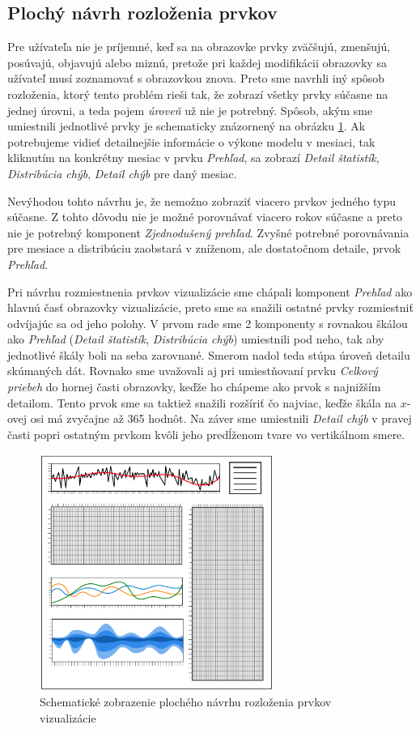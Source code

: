 \subsection{Plochý návrh rozloženia prvkov} %
Pre užívateľa nie je príjemné, keď sa na obrazovke prvky zväčšujú, zmenšujú, posúvajú, objavujú alebo miznú, pretože pri každej modifikácii obrazovky sa užívateľ musí zoznamovať s obrazovkou znova.
Preto sme navrhli iný spôsob rozloženia, ktorý tento problém rieši tak, že zobrazí všetky prvky súčasne na jednej úrovni, a teda pojem \textit{úroveň} už nie je potrebný. Spôsob, akým sme umiestnili jednotlivé prvky je schematicky znázornený na obrázku \ref{fig:flatlayout}. Ak potrebujeme vidieť detailnejšie informácie o výkone modelu v mesiaci, tak kliknutím na konkrétny mesiac v prvku \textit{Prehľad}, sa zobrazí \textit{Detail štatistík}, \textit{Distribúcia chýb}, \textit{Detail chýb} pre daný mesiac.

Nevýhodou tohto návrhu je, že nemožno zobraziť viacero prvkov jedného typu súčasne. Z tohto dôvodu nie je možné porovnávať viacero rokov súčasne a preto nie je potrebný komponent \textit{Zjednodušený prehľad}. Zvyšné potrebné porovnávania pre mesiace a distribúciu zaobstará v zníženom, ale dostatočnom detaile, prvok \textit{Prehľad}. 

Pri návrhu rozmiestnenia prvkov vizualizácie sme chápali komponent \textit{Prehľad} ako hlavnú časť obrazovky vizualizácie, preto sme sa snažili ostatné prvky rozmiestniť odvíjajúc sa od jeho polohy. V prvom rade sme 2 komponenty s rovnakou škálou ako \textit{Prehľad} (\textit{Detail štatistík}, \textit{Distribúcia chýb}) umiestnili pod neho, tak aby jednotlivé škály boli na seba zarovnané. Smerom nadol teda stúpa úroveň detailu skúmaných dát. Rovnako sme uvažovali aj pri umiestňovaní prvku \textit{Celkový priebeh} do hornej časti obrazovky, keďže ho chápeme ako prvok s najnižším detailom. Tento prvok sme sa taktiež snažili rozšíriť čo najviac, keďže škála na \mbox{$ x $-ovej} osi má zvyčajne až 365 hodnôt. Na záver sme umiestnili \textit{Detail chýb} v pravej časti popri ostatným prvkom kvôli jeho predĺženom tvare vo vertikálnom smere.

\begin{figure}
	\centering
	\includegraphics[width = 3.0in]{flatlayout}
	\caption{Schematické zobrazenie plochého návrhu rozloženia prvkov vizualizácie}
	\label{fig:flatlayout}
\end{figure}